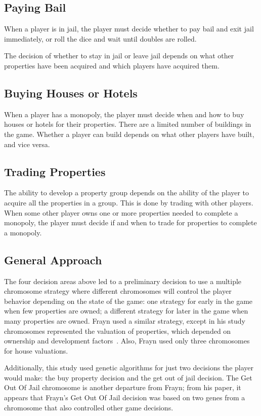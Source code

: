 \subsection{Paying Bail}
When a player is in jail, the player must decide whether to pay bail and exit
jail immediately, or roll the dice and wait until doubles are rolled.

The decision of whether to stay in jail or leave jail depends on what other
properties have been acquired and which players have acquired them.

\subsection{Buying Houses or Hotels}
When a player has a monopoly, the player must decide when and how to buy houses
or hotels for their properties. There are a limited number of buildings in the
game. Whether a player can build depends on what other players have built, and
vice versa.

\subsection{Trading Properties}
The ability to develop a property group depends on the ability of the player to
acquire all the properties in a group. This is done by trading with other
players. When some other player owns one or more properties needed to complete a
monopoly, the player must decide if and when to trade for properties to complete
a monopoly.

\subsection{General Approach}

The four decision areas above led to a preliminary decision to use a multiple
chromosome strategy where different chromosomes will control the player behavior
depending on the state of the game: one strategy for early in the game when few
properties are owned; a different strategy for later in the game when many
properties are owned. Frayn used a similar strategy, except in his study
chromosomes represented the valuation of properties, which depended on ownership
and development factors~\cite{DBLP:conf/cig/Frayn05}. Also, Frayn used only
three chromosomes for house valuations.

Additionally, this study used genetic algorithms for just two decisions the
player would make: the buy property decision and the get out of jail decision.
The Get Out Of Jail chromosome is another departure from Frayn; from his paper,
it appears that Frayn's Get Out Of Jail decision was based on two genes from a
chromosome that also controlled other game decisions.
 
